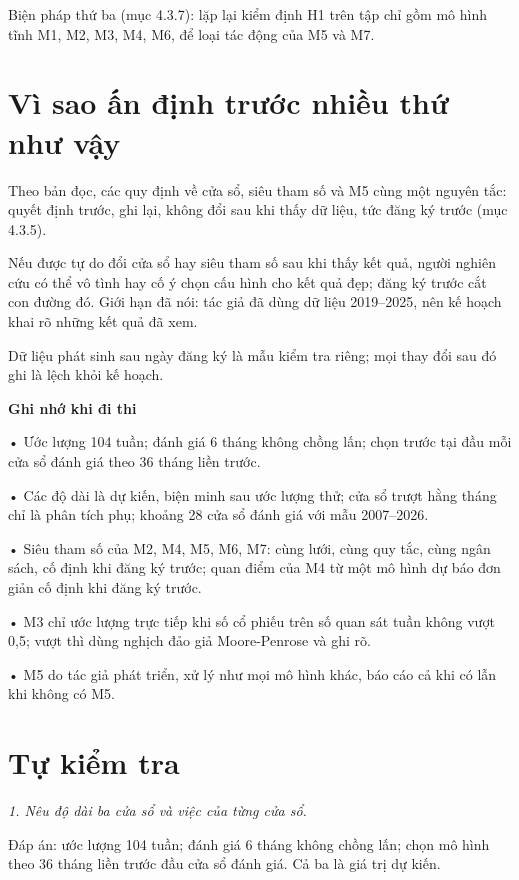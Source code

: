Biện pháp thứ ba (mục 4.3.7): lặp lại kiểm định H1 trên tập chỉ gồm mô hình tĩnh M1, M2, M3, M4, M6, để loại tác động của M5 và M7.

\section{Vì sao ấn định trước nhiều thứ như vậy}

Theo bản đọc, các quy định về cửa sổ, siêu tham số và M5 cùng một nguyên tắc: quyết định trước, ghi lại, không đổi sau khi thấy dữ liệu, tức đăng ký trước (mục 4.3.5).

Nếu được tự do đổi cửa sổ hay siêu tham số sau khi thấy kết quả, người nghiên cứu có thể vô tình hay cố ý chọn cấu hình cho kết quả đẹp; đăng ký trước cắt con đường đó. Giới hạn đã nói: tác giả đã dùng dữ liệu 2019--2025, nên kế hoạch khai rõ những kết quả đã xem.

Dữ liệu phát sinh sau ngày đăng ký là mẫu kiểm tra riêng; mọi thay đổi sau đó ghi là lệch khỏi kế hoạch.

\begin{tcolorbox}[breakable]
\textbf{Ghi nhớ khi đi thi}

• Ước lượng 104 tuần; đánh giá 6 tháng không chồng lấn; chọn trước tại đầu mỗi cửa sổ đánh giá theo 36 tháng liền trước.

• Các độ dài là dự kiến, biện minh sau ước lượng thử; cửa sổ trượt hằng tháng chỉ là phân tích phụ; khoảng 28 cửa sổ đánh giá với mẫu 2007--2026.

• Siêu tham số của M2, M4, M5, M6, M7: cùng lưới, cùng quy tắc, cùng ngân sách, cố định khi đăng ký trước; quan điểm của M4 từ một mô hình dự báo đơn giản cố định khi đăng ký trước.

• M3 chỉ ước lượng trực tiếp khi số cổ phiếu trên số quan sát tuần không vượt 0,5; vượt thì dùng nghịch đảo giả Moore-Penrose và ghi rõ.

• M5 do tác giả phát triển, xử lý như mọi mô hình khác, báo cáo cả khi có lẫn khi không có M5.
\end{tcolorbox}

\section{Tự kiểm tra}

{\itshape 1. Nêu độ dài ba cửa sổ và việc của từng cửa sổ.\par}

Đáp án: ước lượng 104 tuần; đánh giá 6 tháng không chồng lấn; chọn mô hình theo 36 tháng liền trước đầu cửa sổ đánh giá. Cả ba là giá trị dự kiến.

